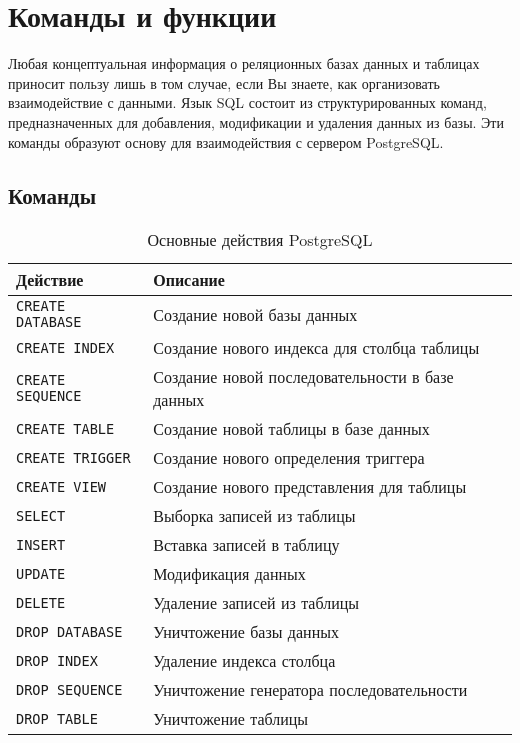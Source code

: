 \documentclass[a4paper,12pt,notitlepage,headsepline,pdftex]{scrartcl}
\begin{document}
  \pagebreak
\section{Команды и функции}
  Любая концептуальная информация о реляционных базах данных и таблицах
  приносит пользу лишь в том случае, если Вы знаете, как организовать
  взаимодействие с данными.
  Язык SQL состоит из структурированных команд, предназначенных для
  добавления, модификации и удаления данных из базы.
  Эти команды образуют основу для взаимодействия с сервером PostgreSQL.

  \subsection{Команды}
    \begin{table}[h]
      \centering
      \caption{Основные действия PostgreSQL}\label{tab:commands}
      \begin{tabular}[c]{l|l}
        \hline
        \textbf{Действие} & \textbf{Описание}\\
        \hline
        \texttt{CREATE DATABASE} & Создание новой базы данных\\
        \texttt{CREATE INDEX} & Создание нового индекса для столбца таблицы\\
        \texttt{CREATE SEQUENCE} & Создание новой последовательности в базе
                                  данных\\
        \texttt{CREATE TABLE} & Создание новой таблицы в базе данных\\
        \texttt{CREATE TRIGGER} & Создание нового определения триггера\\
        \texttt{CREATE VIEW} & Создание нового представления для таблицы\\
        \texttt{SELECT} & Выборка записей из таблицы\\
        \texttt{INSERT} & Вставка записей в таблицу\\
        \texttt{UPDATE} & Модификация данных\\
        \texttt{DELETE} & Удаление записей из таблицы\\
        \texttt{DROP DATABASE} & Уничтожение базы данных\\
        \texttt{DROP INDEX} & Удаление индекса столбца\\
        \texttt{DROP SEQUENCE} & Уничтожение генератора последовательности\\
        \texttt{DROP TABLE} & Уничтожение таблицы\\

\end{tabular}
\end{table}
\end{document}
